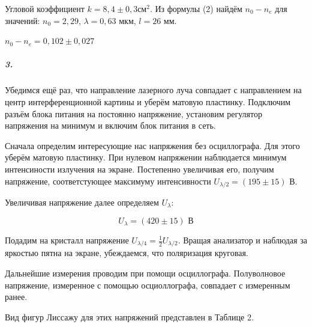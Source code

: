 \documentclass[a4paper,12pt]{article}
\begin{document}
Угловой коэффициент $k= 8,4 \pm 0,3 см^2$. Из формулы (2) найдём $n_0-n_e$ для значений: $n_0 = 2,29$, $\lambda = 0,63$ мкм, $l = 26$ мм.

\begin{center}
    $n_0-n_e = 0,102\pm 0,027$
\end{center}

\subparagraph{3.} \par Убедимся ещё раз, что направление лазерного луча совпадает с направлением на центр интерференционной картины и уберём матовую пластинку. Подключим разъём блока питания на постоянно напряжение, установим регулятор напряжения на минимум и включим блок питания в сеть.

Сначала определим интересующие нас напряжения без осциллографа. Для этого уберём матовую пластинку. При нулевом напряжении наблюдается минимум интенсиности излучения на экране. Постепенно увеличивая его, получим напряжение, соответстующее максимуму интенсивности $U_{\lambda/2} = (195 \pm 15) \text{ В}$.

Увеличивая напряжение далее определяем $U_\lambda$:

\[U_\lambda = (420 \pm 15) \text{ В} \]

\par Подадим на кристалл напряжение $U_{\lambda/4} = \frac{1}{2}U_{\lambda/2}$. Вращая анализатор и наблюдая за яркостью пятна на экране, убеждаемся, что поляризация круговая.\par

Дальнейшие измерения проводим при помощи осциллографа. Полуволновое напряжение, измеренное с помощью осциоллографа, совпадает с измеренным ранее. 

Вид фигур Лиссажу для этих напряжений представлен в Таблице 2.
\end{document}
